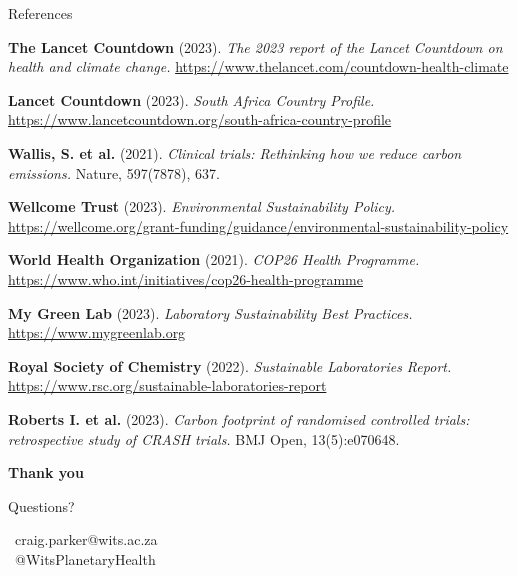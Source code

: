 \documentclass{beamer}
\begin{document}
\begin{frame}[allowframebreaks]{References}
\begin{thebibliography}{99}
\textbf{The Lancet Countdown} (2023).
\textit{The 2023 report of the Lancet Countdown on health and climate change.}
\url{https://www.thelancet.com/countdown-health-climate}

\textbf{Lancet Countdown} (2023).
\textit{South Africa Country Profile.}
\url{https://www.lancetcountdown.org/south-africa-country-profile}

\textbf{Wallis, S. et al.} (2021).
\textit{Clinical trials: Rethinking how we reduce carbon emissions.}
Nature, 597(7878), 637.

\textbf{Wellcome Trust} (2023).
\textit{Environmental Sustainability Policy.}
\url{https://wellcome.org/grant-funding/guidance/environmental-sustainability-policy}

\textbf{World Health Organization} (2021).
\textit{COP26 Health Programme.}
\url{https://www.who.int/initiatives/cop26-health-programme}

\textbf{My Green Lab} (2023).
\textit{Laboratory Sustainability Best Practices.}
\url{https://www.mygreenlab.org}

\textbf{Royal Society of Chemistry} (2022).
\textit{Sustainable Laboratories Report.}
\url{https://www.rsc.org/sustainable-laboratories-report}

\textbf{Roberts I. et al.} (2023).
\textit{Carbon footprint of randomised controlled trials: retrospective study of CRASH trials.}
BMJ Open, 13(5):e070648.
\end{thebibliography}
\end{frame}

\begin{frame}[plain]
\begin{center}
\vspace{1cm}
{\Large\textbf{Thank you}}

\vspace{0.5cm}
{\large Questions?}

\vspace{1cm}
\faEnvelope\ craig.parker@wits.ac.za\\
\faTwitter\ @WitsPlanetaryHealth
\end{center}

\end{frame}
\end{document}
